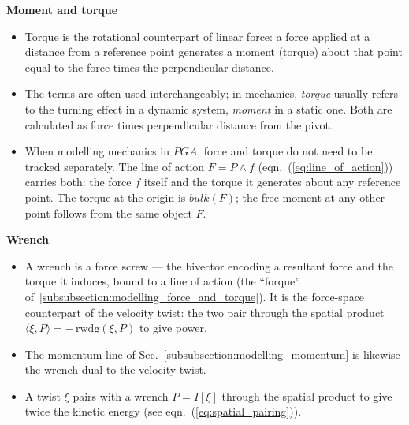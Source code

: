 \textbf{Moment and torque}
\begin{itemize}
    \item Torque is the rotational counterpart of linear force: a force applied at a
    distance from a reference point generates a moment (torque) about that point equal
    to the force times the perpendicular distance.

    \item The terms are often used interchangeably; in mechanics, \emph{torque} usually
    refers to the turning effect in a dynamic system, \emph{moment} in a static one.
    Both are calculated as force times perpendicular distance from the pivot.

    \item When modelling mechanics in $PGA$, force and torque do not need to be tracked
    separately. The line of action $F = P \wedge f$
    (eqn.~(\ref{eq:line_of_action})) carries both: the force $f$ itself and the torque
    it generates about any reference point. The torque at the origin is $bulk(F)$; the
    free moment at any other point follows from the same object $F$.
\end{itemize}

\textbf{Wrench}
\begin{itemize}
    \item A wrench is a force screw --- the bivector encoding a resultant force and
    the torque it induces, bound to a line of action (the ``forque''
    of~\ref{subsubsection:modelling_force_and_torque}). It is the force-space
    counterpart of the velocity twist: the two pair through the spatial product
    $\langle \xi, P \rangle = -\,\mathrm{rwdg}(\xi, P)$ to give power.

    \item The momentum line of Sec.~\ref{subsubsection:modelling_momentum} is likewise the
    wrench dual to the velocity twist.

    \item A twist $\xi$ pairs with a wrench $P = I[\xi]$ through the spatial product to
    give twice the kinetic energy (see eqn.~(\ref{eq:spatial_pairing})).
\end{itemize}

